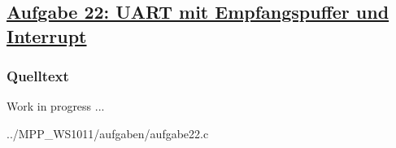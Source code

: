 \subsection*
{\href{http://cst.mi.fu-berlin.de/intern/19606-P-MPP/Aufgaben/040703.html}
{Aufgabe 22: UART mit Empfangspuffer und Interrupt}}

\subsubsection*{Quelltext}

Work in progress ...


{../MPP_WS1011/aufgaben/aufgabe22.c}
